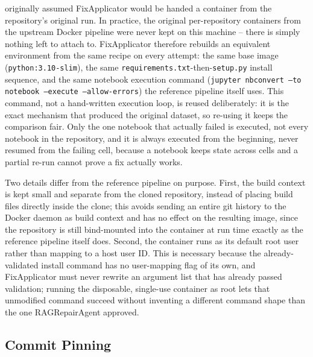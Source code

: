  originally assumed FixApplicator would be handed a
container from the repository's original run. In practice, the original
per-repository containers from the upstream Docker pipeline were never kept
on this machine -- there is simply nothing left to attach to. FixApplicator
therefore rebuilds an equivalent environment from the same recipe on every
attempt: the same base image (\texttt{python:3.10-slim}), the same
\texttt{requirements.txt}-then-\texttt{setup.py} install sequence, and the
same notebook execution command
(\texttt{jupyter nbconvert --to notebook --execute --allow-errors}) the
reference pipeline itself uses. This command, not a hand-written execution
loop, is reused deliberately: it is the exact mechanism that produced the
original dataset, so re-using it keeps the comparison fair. Only the one
notebook that actually failed is executed, not every notebook in the
repository, and it is always executed from the beginning, never resumed
from the failing cell, because a notebook keeps state across cells and a
partial re-run cannot prove a fix actually works.

Two details differ from the reference pipeline on purpose. First, the build
context is kept small and separate from the cloned repository, instead of
placing build files directly inside the clone; this avoids sending an
entire git history to the Docker daemon as build context and has no effect
on the resulting image, since the repository is still bind-mounted into the
container at run time exactly as the reference pipeline itself does.
Second, the container runs as its default root user rather than mapping to
a host user ID. This is necessary because the already-validated install
command has no user-mapping flag of its own, and FixApplicator must never
rewrite an argument list that has already passed validation; running the
disposable, single-use container as root lets that unmodified command
succeed without inventing a different command shape than the one
RAGRepairAgent approved.

\subsection{Commit Pinning}

